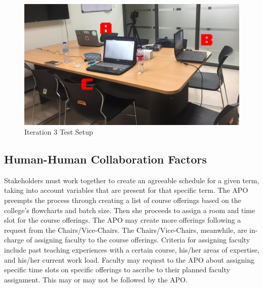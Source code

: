 \begin{table}
\centering
\caption{\label{tab:summarized_significance_testing}Summarized Significance Testing Results}
\end{table}
\begin{figure}[h]
   \centering
   \includegraphics[scale=0.2]{PCSC2019_latex/Tests/test_setup_iteration3.png}
   \caption{Iteration 3 Test Setup}
    \label{fig:itr3_testsetup}
\end{figure}

\subsection{Human-Human Collaboration Factors}
Stakeholders must work together to create an agreeable schedule for a given term, taking into account variables that are present for that specific term. The APO preempts the process through creating a list of course offerings based on the college's flowcharts and batch size. Then she proceeds to assign a room and time slot for the course offerings. The APO may create more offerings following a request from the Chairs/Vice-Chairs. The Chairs/Vice-Chairs, meanwhile, are in-charge of assigning faculty to the course offerings. Criteria for assigning faculty include past teaching experiences with a certain course, his/her areas of expertise, and his/her current work load. Faculty may request to the APO about assigning specific time slots on specific offerings to ascribe to their planned faculty assignment. This may or may not be followed by the APO.


